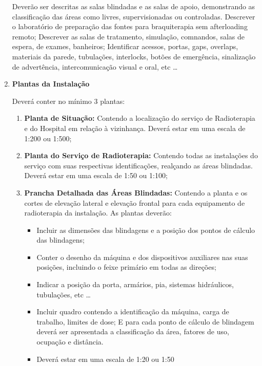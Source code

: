 \documentclass[11pt,a4paper]{article}
\begin{document}
\begin{enumerate}
                    Deverão ser descritas as salas blindadas e as salas de apoio, demonstrando as classificação das áreas como livres, supervisionadas ou controladas. Descrever o laboratório de preparação das fontes para braquiterapia sem afterloading remoto; Descrever as salas de tratamento, simulação, comnandos, salas de espera, de exames, banheiros; Identificar acessos, portas, gaps, overlaps, materiais da parede, tubulações, interlocks, botões de emergência, sinalização de advertência, intercomunicação visual e oral, etc \dots
                
                \item \textbf{\textcolor{CarnationPink}{Plantas da Instalação}}

                    Deverá conter no mínimo 3 plantas:

                    \begin{enumerate}
                        \item \textbf{Planta de Situação:} Contendo a localização do serviço de Radioterapia e do Hospital em relação à vizinhança. Deverá estar em uma escala de 1:200 ou 1:500;
                        \item \textbf{Planta do Serviço de Radioterapia:} Contendo todas as instalações do serviço com suas respectivas identificações, realçando as áreas blindadas. Deverá estar em uma escala de 1:50 ou 1:100;
                        \item \textbf{Prancha Detalhada das Áreas Blindadas:} Contendo a planta e os cortes de elevação lateral e elevação frontal para cada equipamento de radioterapia da instalação. As plantas deverão:

                            \begin{itemize}
                                \item Incluir as dimensões das blindagens e a posição dos pontos de cálculo das blindagens;
                                \item Conter o desenho da máquina e dos dispositivos auxiliares nas suas posições, incluindo o feixe primário em todas as direções;
                                \item Indicar a posição da porta, armários, pia, sistemas hidráulicos, tubulações, etc \dots
                                \item Incluir quadro contendo a identificação da máquina, carga de trabalho, limites de dose; E para cada ponto de cálculo de blindagem deverá ser apresentada a classificação da área, fatores de uso, ocupação e distância.
                                \item Deverá estar em uma escala de 1:20 ou 1:50
                            \end{itemize}
                    \end{enumerate}
            
            \end{enumerate}
\end{document}
